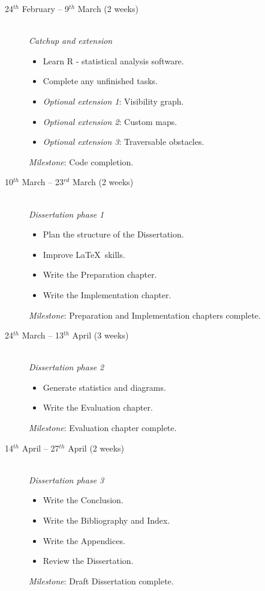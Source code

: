 \begin{description}
\item[24$^{th}$ February -- 9$^{th}$ March (2 weeks)] \hfill \\

{\em Catchup and extension}
\begin{itemize}
\item Learn R - statistical analysis software.
\item Complete any unfinished tasks. 
\item {\em Optional extension 1}: Visibility graph.
\item {\em Optional extension 2}: Custom maps.
\item {\em Optional extension 3}: Traversable obstacles.
\end{itemize}
{\em Milestone}: Code completion.\\

\item[10$^{th}$ March -- 23$^{rd}$ March (2 weeks)] \hfill \\

{\em Dissertation phase 1}
\begin{itemize}
\item Plan the structure of the Dissertation. 
\item Improve \LaTeX\ skills.
\item Write the Preparation chapter.
\item Write the Implementation chapter.
\end{itemize}
{\em Milestone}: Preparation and Implementation chapters complete.\\

\item[24$^{th}$ March -- 13$^{th}$ April (3 weeks)] \hfill \\

{\em Dissertation phase 2}
\begin{itemize}
\item Generate statistics and diagrams.
\item Write the Evaluation chapter.
\end{itemize}
{\em Milestone}: Evaluation chapter complete.\\

\item[14$^{th}$ April -- 27$^{th}$ April (2 weeks)] \hfill \\

{\em Dissertation phase 3}
\begin{itemize}
\item Write the Conclusion.
\item Write the Bibliography and Index.
\item Write the Appendices.
\item Review the Dissertation.
\end{itemize}
{\em Milestone}: Draft Dissertation complete.\\



\end{description}
